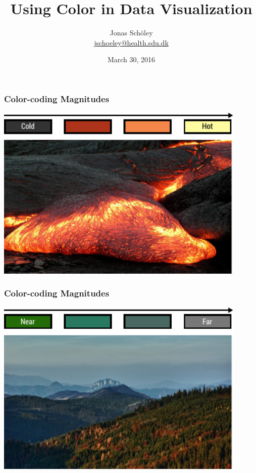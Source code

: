 \documentclass[hyperref={bookmarks=false}]{beamer}
\title{
  Using Color in Data Visualization
}
\author{
  Jonas Schöley\texorpdfstring{\\\url{jschoeley@health.sdu.dk}}{}
}
\institute{
Max-Planck Odense Center on the Biodemography of Aging
}
\date{
  March 30, 2016
}
\begin{document}

\begin{frame}
\frametitle{Color-coding Magnitudes}

\center\includegraphics[width = 0.9\textwidth]{./fig/color_coded_luminance.pdf}


\end{frame}


\begin{frame}
\frametitle{Color-coding Magnitudes}

\center\includegraphics[width = 0.9\textwidth]{./fig/color_coded_saturation.pdf}


\end{frame}
\end{document}

